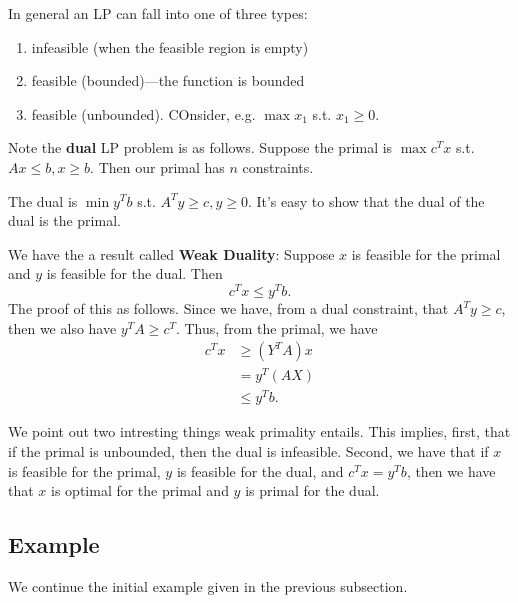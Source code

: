 \documentclass{article}
\begin{document}
In general an LP can fall into one of three types:
\begin{enumerate}
\item
infeasible (when the feasible region is empty)

\item
feasible (bounded)---the function is bounded

\item
feasible (unbounded). COnsider, e.g. $\max x_1$ s.t. $x_1 \geq 0$.

\end{enumerate}



Note the \textbf{dual} LP problem is as follows.
Suppose the primal is $\max c^Tx$ s.t. $Ax \leq b, x\geq b$.
Then our primal has $n$ constraints.

The dual is $\min y^T b$ s.t. $A^Ty \geq c, y \geq 0$.
It's easy to show that the dual of the dual is the primal.

We have the a result called \textbf{Weak Duality}:
Suppose $x$ is feasible for the primal and $y$ is feasible for the dual.
Then
$$
c^Tx \leq y^T b.
$$
The proof of this as follows.
Since we have, from a dual constraint, that $A^Ty \geq c$, then
we also have $y^TA \geq c^T$.
Thus, from the primal, we have 
\begin{align}
c^Tx &\geq (Y^TA)x \\
&= y^T(AX) \\
&\leq y^Tb.
\end{align}

We point out two intresting things weak primality entails.
This implies, first, that if the primal is unbounded, then the dual is 
infeasible.
Second, we have that if $x$ is feasible for the primal, $y$ is feasible
for the dual, and $c^Tx = y^Tb$, then we have that $x$ is optimal
for the primal and $y$ is primal for the dual.

\subsection{Example}
We continue the initial example given in the previous subsection.
\end{document}
